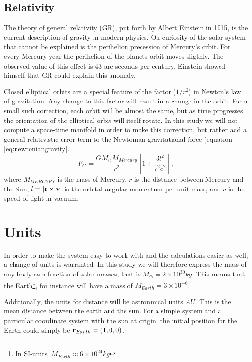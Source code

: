 \documentclass[10pt,a4paper]{amsart}
\begin{document}
\subsection{Relativity}

The theory of general relativity (GR), put forth by Albert Einstein in 1915, is the current description of gravity in modern physics. On curiosity of the solar system that cannot be explained is the perihelion precession of Mercury's orbit. For every Mercury year the perihelion of the planets orbit moves sligthly. The observed value of this effect is $43$ arc-seconds per century. Einstein showed himself that GR could explain this anomaly.

Closed elliptical orbits are a special feature of the factor ($1/r^2$) in Newton's law of gravitation. Any change to this factor will result in a change in the orbit. For a small such correction, each orbit will be almost the same, but as time progresses the orientation of the elliptical orbit will itself rotate. In this study we will not compute a space-time manifold in order to make this correction, but rather add a general relativistic error term to the Newtonian gravitational force (equation \ref{eq:newtoniangravity}.
\begin{equation}
\label{eq:relativenewton}
F_G = \frac{GM_{\odot}M_{Mercury}}{r^2}\left[1+\frac{3l^2}{r^2c^2} \right],
\end{equation}
where $M_{MERCURY}$ is the mass of Mercury, $r$ is the distance between Mercury and the Sun, $l=\abs{\vb{r}\times\vb{v}}$ is the orbital angular momentum per unit mass, and $c$ is the speed of light in vacuum.

\section{Units}
In order to make the system easy to work with and the calculations easier as well, a change of units is warranted. In this study we will therefore express the mass of any body as a fraction of solar masses, that is $M_{\odot} = 2\times10^{30}kg$. This means that the Earth\footnote{In SI-units, $M_{Earth}\approx6\times10^{24}kg$}, for instance will have a mass of $M_{Earth}= 3\times10^{-6}$.

Additionally, the units for distance will be astronmical units $AU$. This is the mean distance between the earth and the sun. For a simple system and a particular coordinate system with the sun at origin, the initial position for the Earth could simply be $\vb{r}_ {Earth}=(1,0,0)$.
\end{document}
